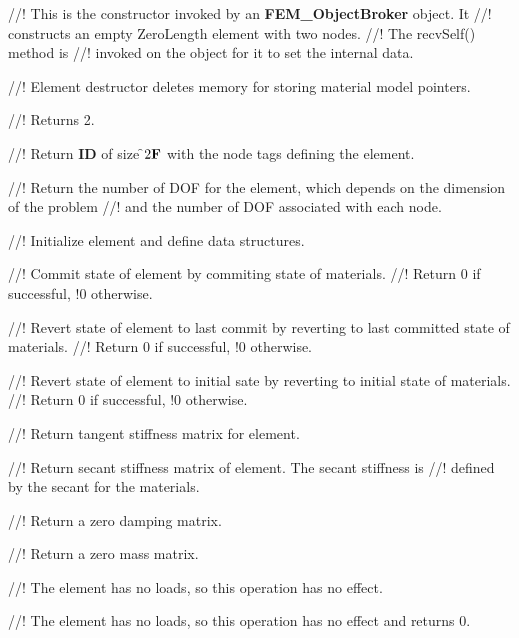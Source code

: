 //! This is the constructor invoked by an {\bf FEM\_ObjectBroker} object. It
//! constructs an empty ZeroLength element with two nodes.
//! The recvSelf() method is
//! invoked on the object for it to set the internal data. 


//! Element destructor deletes memory for storing material model pointers. 


//! Returns 2.


//! Return {\bf ID} of size \f$2{\bf F}$ with the node tags defining the element.


//! Return the number of DOF for the element, which depends on the dimension of the problem
//! and the number of DOF associated with each node.


//! Initialize element and define data structures.


//! Commit state of element by commiting state of materials.
//! Return 0 if successful, !0 otherwise.


//! Revert state of element to last commit by reverting to last committed state of materials.
//! Return 0 if successful, !0 otherwise.


//! Revert state of element to initial sate by reverting to initial state of materials.
//! Return 0 if successful, !0 otherwise.


//! Return tangent stiffness matrix for element.


//! Return secant stiffness matrix of element.  The secant stiffness is
//! defined by the secant for the materials.


//! Return a zero damping matrix.


//! Return a zero mass matrix.


//! The element has no loads, so this operation has no effect.


//! The element has no loads, so this operation has no effect and returns 0.


